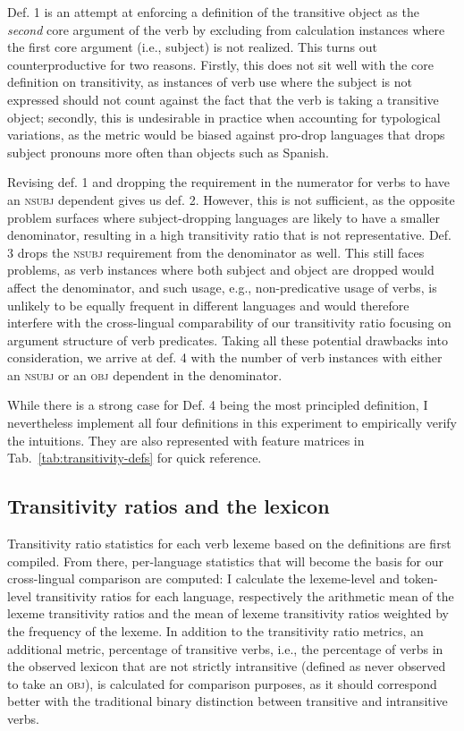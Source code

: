 Def. 1 is an attempt at enforcing a definition of the transitive object as the \textit{second} core argument of the verb by excluding from calculation instances where the first core argument (i.e., subject) is not realized. This turns out counterproductive for two reasons. Firstly, this does not sit well with the core definition on transitivity, as instances of verb use where the subject is not expressed should not count against the fact that the verb is taking a transitive object; secondly, this is undesirable in practice when accounting for typological variations, as the metric would be biased against pro-drop languages that drops subject pronouns more often than objects such as Spanish.

Revising def. 1 and dropping the requirement in the numerator for verbs to have an \textsc{nsubj} dependent gives us def. 2. However, this is not sufficient, as the opposite problem surfaces where subject-dropping languages are likely to have a smaller denominator, resulting in a high transitivity ratio that is not representative. Def. 3 drops the \textsc{nsubj} requirement from the denominator as well. This still faces problems, as verb instances where both subject and object are dropped would affect the denominator, and such usage, e.g., non-predicative usage of verbs, is unlikely to be equally frequent in different languages and would therefore interfere with the cross-lingual comparability of our transitivity ratio focusing on argument structure of verb predicates. Taking all these potential drawbacks into consideration, we arrive at def. 4 with the number of verb instances with either an \textsc{nsubj} or an \textsc{obj} dependent in the denominator. 



While there is a strong case for Def. 4 being the most principled definition, I nevertheless implement all four definitions in this experiment to empirically verify the intuitions. They are also represented with feature matrices in Tab.~\ref{tab:transitivity-defs} for quick reference.

\subsection{Transitivity ratios and the lexicon}

Transitivity ratio statistics for each verb lexeme based on the definitions are first compiled. From there, per-language statistics that will become the basis for our cross-lingual comparison are computed: I calculate the lexeme-level and token-level transitivity ratios for each language, respectively the arithmetic mean of the lexeme transitivity ratios and the mean of lexeme transitivity ratios weighted by the frequency of the lexeme. In addition to the transitivity ratio metrics, an additional metric, percentage of transitive verbs, i.e., the percentage of verbs in the observed lexicon that are not strictly intransitive (defined as never observed to take an \textsc{obj}), is calculated for comparison purposes, as it should correspond better with the traditional binary distinction between transitive and intransitive verbs.

